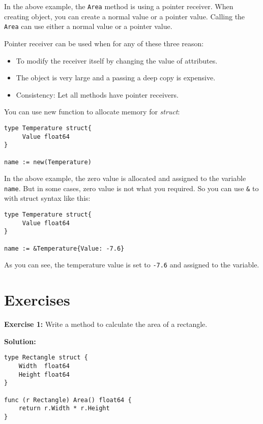 

In the above example, the \texttt{Area} method is using a pointer
receiver.  When creating object, you can create a normal value or a
pointer value.  Calling the \texttt{Area} can use either a normal
value or a pointer value.

Pointer receiver can be used when for any of
these three reason:

\begin{itemize}
\item To modify the receiver itself by changing the value of attributes.
\item The object is very large and a passing a deep copy is expensive.
\item Consistency: Let all methods have pointer receivers.
\end{itemize}

You can use new function to allocate memory for \textit{struct}:

\begin{lstlisting}[numbers=none]
type Temperature struct{
     Value float64
}

name := new(Temperature)
\end{lstlisting}

In the above example, the zero value is allocated and assigned to the
variable \texttt{name}.  But in some cases, zero value is not what you
required.  So you can use \texttt{\&} to with struct syntax like this:

\begin{lstlisting}[numbers=none]
type Temperature struct{
     Value float64
}

name := &Temperature{Value: -7.6}
\end{lstlisting}

As you can see, the temperature value is set to \texttt{-7.6} and
assigned to the variable.

\section{Exercises}

\textbf{Exercise 1:} Write a method to calculate the area of a rectangle.

\textbf{Solution:}

\begin{lstlisting}[numbers=none]
type Rectangle struct {
    Width  float64
    Height float64
}

func (r Rectangle) Area() float64 {
    return r.Width * r.Height
}
\end{lstlisting}

